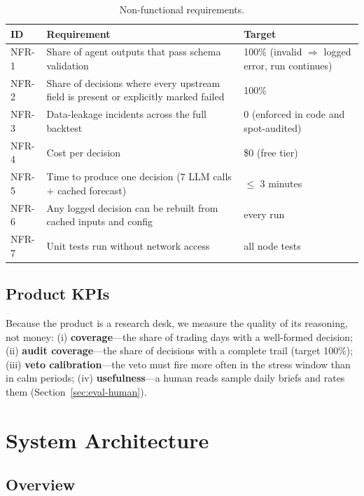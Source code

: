 \documentclass[conference]{IEEEtran}
\begin{document}
\begin{table}[!t]
\centering
\caption{Non-functional requirements.}
\label{tab:nfr}
\small
\begin{tabularx}{\columnwidth}{L{0.85cm} X L{1.6cm}}
\toprule
\textbf{ID} & \textbf{Requirement} & \textbf{Target} \\
\midrule
NFR-1 & Share of agent outputs that pass schema validation & 100\% (invalid $\Rightarrow$ logged error, run continues) \\
NFR-2 & Share of decisions where every upstream field is present or explicitly marked failed & 100\% \\
NFR-3 & Data-leakage incidents across the full backtest & 0 (enforced in code and spot-audited) \\
NFR-4 & Cost per decision & \$0 (free tier) \\
NFR-5 & Time to produce one decision (7 LLM calls + cached forecast) & $\le$ 3 minutes \\
NFR-6 & Any logged decision can be rebuilt from cached inputs and config & every run \\
NFR-7 & Unit tests run without network access & all node tests \\
\bottomrule
\end{tabularx}
\end{table}

\subsection{Product KPIs}

Because the product is a research desk, we measure the quality of its reasoning, not money: (i) \textbf{coverage}---the share of trading days with a well-formed decision; (ii) \textbf{audit coverage}---the share of decisions with a complete trail (target 100\%); (iii) \textbf{veto calibration}---the veto must fire more often in the stress window than in calm periods; (iv) \textbf{usefulness}---a human reads sample daily briefs and rates them (Section~\ref{sec:eval-human}).

\section{System Architecture}
\label{sec:arch}

\subsection{Overview}
\end{document}
